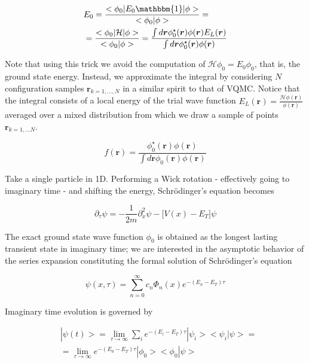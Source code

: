 \documentclass[10pt, twocolumn, twoside]{article}
\begin{document}
\begin{equation}
\begin{split}
&E_0 = \frac{ < \phi_0 |E_0 \mathbbm{1} | \phi >}{< \phi_0 | \phi >} = \\
&= \frac{< \phi_0 | \mathcal{H} | \phi >}{ <\phi_0 | \phi >} = \frac{\int d\bm r \phi_0^\star (\bm r) \phi (\bm r) E_L (\bm r)}{\int d\bm r\phi_0^\star (\bm r) \phi (\bm r)}
\end{split}
\end{equation}

Note that using this trick we avoid the computation of $\mathcal{H} \phi_0 = E_0 \phi_0$, that is, the ground state energy. Instead, we approximate the integral by considering $N$ configuration samples $\bm r_{k = 1,..., N}$ in a similar spirit to that of VQMC. Notice that the integral consists of a local energy of the trial wave function $E_L (\bm r) = \frac{\mathcal{H} \phi (\bm r)}{\phi (\bm r)}$ averaged over a mixed distribution from which we draw a sample of points $\bm r_{k=1,...N}$.

\begin{equation}
f(\bm r) = \frac{\phi_0^\star (\bm r) \phi (\bm r) }{ \int d\bm r  \phi_0 (\bm r) \phi (\bm r)}
\end{equation}

Take a single particle in 1D. Performing a Wick rotation - effectively going to imaginary time - and shifting the energy, Schr\"odinger's equation becomes

\begin{equation}
\partial_\tau \psi = -\frac{1}{2m} \partial^2_x \psi - \bigg[ V(x) - E_T \bigg] \psi
\end{equation}

The exact ground state wave function $\phi_0$ is obtained as the longest lasting transient state in imaginary time; we are interested in the asymptotic behavior of the series expansion constituting the formal solution of Schr\"odinger's equation

\begin{equation}
\psi (x, \tau) = \sum_{n=0}^{\infty} c_n \Phi_n (x) e^{-(E_n - E_T)\tau}
\end{equation}

Imaginary time evolution is governed by

\begin{equation}\label{eq:im_ev}
\begin{split}
&| \psi (t) > = \lim_{\tau \rightarrow \infty} \sum_i e^{-(E_i - E_T) \tau} |\psi_i > <\psi_i | \psi > = \\
&= \lim_{\tau \rightarrow \infty} e^{-(E_0 - E_T)\tau} | \phi_0 >< \phi_0 | \psi > 
\end{split}
\end{equation}
\end{document}
